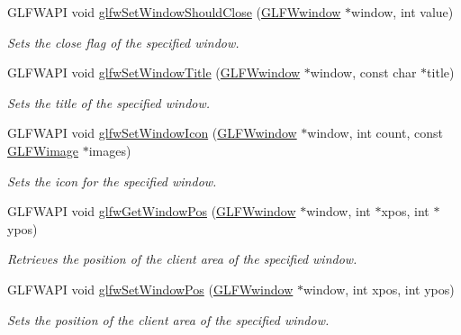 \begin{CompactItemize}
GLFWAPI void \hyperlink{group__window_g1cadeda7a1e2f224e06a8415d30741aa}{glfwSetWindowShouldClose} (\hyperlink{group__window_g3c96d80d363e67d13a41b5d1821f3242}{GLFWwindow} $\ast$window, int value)
\begin{CompactList}\small\item\em Sets the close flag of the specified window. \item\end{CompactList}\item 
GLFWAPI void \hyperlink{group__window_g861ed3414ab8120e2f74151a666ed1dc}{glfwSetWindowTitle} (\hyperlink{group__window_g3c96d80d363e67d13a41b5d1821f3242}{GLFWwindow} $\ast$window, const char $\ast$title)
\begin{CompactList}\small\item\em Sets the title of the specified window. \item\end{CompactList}\item 
GLFWAPI void \hyperlink{group__window_g182987a1a62a41a924842b9473d560df}{glfwSetWindowIcon} (\hyperlink{group__window_g3c96d80d363e67d13a41b5d1821f3242}{GLFWwindow} $\ast$window, int count, const \hyperlink{struct_g_l_f_wimage}{GLFWimage} $\ast$images)
\begin{CompactList}\small\item\em Sets the icon for the specified window. \item\end{CompactList}\item 
GLFWAPI void \hyperlink{group__window_g0076a8591ef7494d359730cf2250b45b}{glfwGetWindowPos} (\hyperlink{group__window_g3c96d80d363e67d13a41b5d1821f3242}{GLFWwindow} $\ast$window, int $\ast$xpos, int $\ast$ypos)
\begin{CompactList}\small\item\em Retrieves the position of the client area of the specified window. \item\end{CompactList}\item 
GLFWAPI void \hyperlink{group__window_g0dc8d880a0d87be16d3ea8114561f6f0}{glfwSetWindowPos} (\hyperlink{group__window_g3c96d80d363e67d13a41b5d1821f3242}{GLFWwindow} $\ast$window, int xpos, int ypos)
\begin{CompactList}\small\item\em Sets the position of the client area of the specified window. \item\end{CompactList}\item 

\end{CompactItemize}
